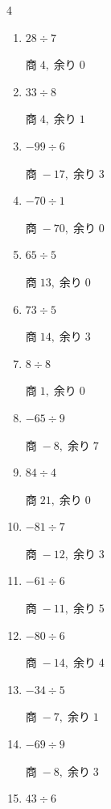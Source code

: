 \begin{multicols}{4}
\begin{enumerate}
        $商\; 14,\; 余り\; 0$

  \item $28 \div 7$

        $商\; 4,\; 余り\; 0$

  \item $33 \div 8$

        $商\; 4,\; 余り\; 1$

  \item $-99 \div 6$

        $商\; -17,\; 余り\; 3$

  \item $-70 \div 1$

        $商\; -70,\; 余り\; 0$

  \item $65 \div 5$

        $商\; 13,\; 余り\; 0$

  \item $73 \div 5$

        $商\; 14,\; 余り\; 3$

  \item $8 \div 8$

        $商\; 1,\; 余り\; 0$

  \item $-65 \div 9$

        $商\; -8,\; 余り\; 7$

  \item $84 \div 4$

        $商\; 21,\; 余り\; 0$

  \item $-81 \div 7$

        $商\; -12,\; 余り\; 3$

  \item $-61 \div 6$

        $商\; -11,\; 余り\; 5$

  \item $-80 \div 6$

        $商\; -14,\; 余り\; 4$

  \item $-34 \div 5$

        $商\; -7,\; 余り\; 1$

\columnbreak %

  \item $-69 \div 9$

        $商\; -8,\; 余り\; 3$

  \item $43 \div 6$


\end{enumerate}
\end{multicols}
